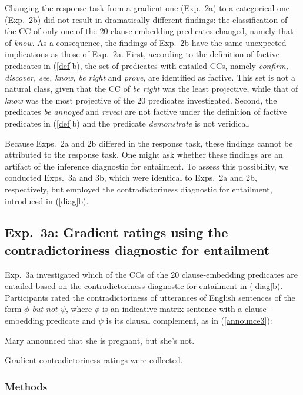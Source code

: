 \documentclass[11pt,fleqn]{article}
\newcommand{\6}{\mbox{$[\hspace*{-.6mm}[$}}
\newcommand{\9}{\mbox{$]\hspace*{-.6mm}]$}}
\begin{document}
Changing the response task from a gradient one (Exp.~2a) to a categorical one (Exp.~2b) did not result in dramatically different findings: the classification of the CC of only one of the 20 clause-embedding predicates changed, namely that of {\em know}. As a consequence, the findings of Exp.~2b have the same unexpected implications as those of Exp.~2a. First, according to the definition of factive predicates in (\ref{def}b), the set of predicates with entailed CCs, namely {\em confirm, discover, see, know, be right} and {\em prove}, are identified as factive. This set is not a natural class, given that the CC of {\em be right} was the least projective, while that of {\em know} was the most projective of the 20 predicates investigated. Second, the predicates {\em be annoyed} and {\em reveal} are not factive under the definition of factive predicates in (\ref{def}b) and the predicate {\em demonstrate} is not veridical. 


Because Exps.~2a and 2b differed in the response task, these findings cannot be attributed to the response task. One might ask whether these findings are an artifact of the inference diagnostic for entailment. To assess this possibility, we conducted Exps.~3a and 3b, which were identical to Exps.~2a and 2b, respectively, but employed the contradictoriness diagnostic for entailment, introduced in (\ref{diag}b).

\subsection{Exp.~3a: Gradient ratings using the contradictoriness diagnostic for entailment}\label{s32}

Exp.~3a investigated which of the CCs of the 20 clause-embedding predicates are entailed based on the contradictoriness diagnostic for entailment in (\ref{diag}b). Participants rated the contradictoriness of utterances of English sentences of the form {\em $\phi$ but not $\psi$}, where $\phi$ is an indicative matrix sentence with a clause-embedding predicate and $\psi$ is its clausal complement, as in (\ref{announce3}):

\begin{exe}
\ex\label{announce3} Mary announced that she is pregnant, but she's not.
\end{exe}
Gradient contradictoriness ratings were collected.

\subsubsection{Methods}
\end{document}
